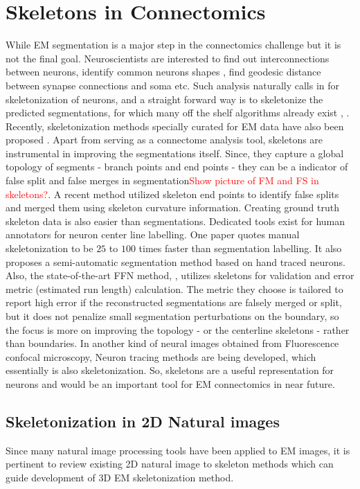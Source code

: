 \section{Skeletons in Connectomics}
While EM segmentation is a major step in the connectomics challenge but it is not the final goal. Neuroscientists are interested to find out interconnections between neurons, identify common neurons shapes \cite{Zhao2014}, find geodesic distance between synapse connections and soma etc. Such analysis naturally calls in for skeletonization of neurons, and a straight forward way is to skeletonize the predicted segmentations, for which many off the shelf algorithms already exist \cite{TEASAR}, \cite{Palagyi2014}. Recently, skeletonization methods specially curated for EM data have also been proposed \cite{Brian2019Skel}. 
Apart from serving as a connectome analysis tool, skeletons are instrumental in improving the segmentations itself. Since, they capture a global topology of segments - branch points and end points - they can be a indicator of false split and false merges in segmentation\textcolor{red}{Show picture of FM and FS in skeletons?}. A recent method \cite{Brain2019} utilized skeleton end points to identify false splits and merged them using skeleton curvature information.
Creating ground truth skeleton data is also easier than segmentations. Dedicated tools \cite{KNOSSOS} exist for human annotators for neuron center line labelling. One paper \cite{Berning2015} quotes manual skeletonization to be $25$ to $100$ times faster than segmentation labelling. It also proposes a semi-automatic segmentation method based on hand traced neurons. 
Also, the state-of-the-art FFN method, \cite{Januszewski2017FFN}, \cite{Januszewski2018FFN} utilizes skeletons for validation and error metric (estimated run length) calculation. The metric they choose is tailored to report high error if the reconstructed segmentations are falsely merged or split, but it does not penalize small segmentation perturbations on the boundary, so the focus is more on improving the topology - or the centerline skeletons - rather than boundaries.
In another kind of neural images obtained from Fluorescence confocal microscopy, Neuron tracing \cite{Kayasandik2018} methods are being developed, which essentially is also skeletonization.
So, skeletons are a useful representation for neurons and would be an important tool for EM connectomics in near future.

\subsection{Skeletonization in 2D Natural images}
Since many natural image processing tools have been applied to EM images, it is pertinent to review existing 2D natural image to skeleton methods which can guide development of 3D EM skeletonization method. 

